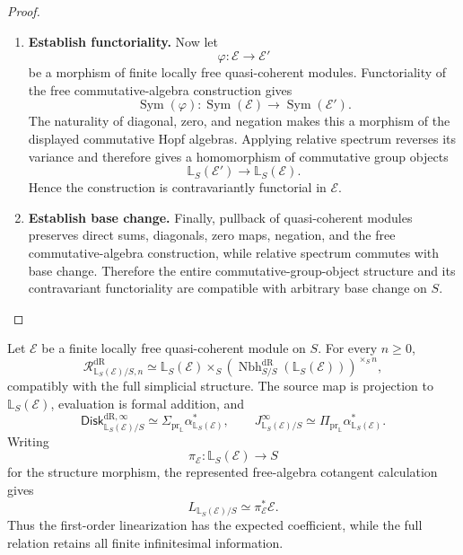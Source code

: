 \begin{proof}
\begin{enumerate}[label=\textup{(\arabic*)}]
    \item \textbf{Establish functoriality.}
Now let
\[
  \varphi:\mathcal E\to \mathcal E'
\]
be a morphism of finite locally free quasi-coherent modules. Functoriality of
the free commutative-algebra construction gives
\[
  \operatorname{Sym}(\varphi):
  \operatorname{Sym}(\mathcal E)\longrightarrow\operatorname{Sym}(\mathcal E').
\]
The naturality of diagonal, zero, and negation makes this a morphism of the
displayed commutative Hopf algebras. Applying relative spectrum reverses its
variance and therefore gives a homomorphism of commutative group objects
\[
  \mathbb L_S(\mathcal E')
  \longrightarrow
  \mathbb L_S(\mathcal E).
\]
Hence the construction is contravariantly functorial in \(\mathcal E\).

    \item \textbf{Establish base change.}
Finally, pullback of quasi-coherent modules preserves direct sums, diagonals,
zero maps, negation, and the free commutative-algebra construction, while
relative spectrum commutes with base change. Therefore the entire
commutative-group-object structure and its contravariant functoriality are
compatible with arbitrary base change on \(S\).
\end{enumerate}
\end{proof}
\begin{proposition}
\label{prop:linear-translation-presentation}
Let \(\mathcal E\) be a finite locally free quasi-coherent module on \(S\).
For every \(n\geq0\),
\[
  \mathcal R^{\mathrm{dR}}_{\mathbb L_S(\mathcal E)/S,n}
  \simeq
  \mathbb L_S(\mathcal E)\times_S(\operatorname{Nbh}^{\mathrm{dR}}_{S/S}(\mathbb L_S(\mathcal E)))^{\times_S n},
\]
compatibly with the full simplicial structure. The source map is projection to
\(\mathbb L_S(\mathcal E)\), evaluation is formal addition, and
\[
  \mathsf{Disk}^{\mathrm{dR},\infty}_{\mathbb L_S(\mathcal E)/S}
  \simeq
  \Sigma_{\operatorname{pr}_{\mathbb L}}\alpha_{\mathbb L_S(\mathcal E)}^*,
  \qquad
  J^\infty_{\mathbb L_S(\mathcal E)/S}
  \simeq
  \Pi_{\operatorname{pr}_{\mathbb L}}\alpha_{\mathbb L_S(\mathcal E)}^*.
\]
Writing
\[
  \pi_{\mathcal E}:\mathbb L_S(\mathcal E)\to S
\]
for the structure morphism, the represented free-algebra cotangent calculation gives
\[
  L_{\mathbb L_S(\mathcal E)/S}
  \simeq
  \pi_{\mathcal E}^*\mathcal E.
\]
Thus the first-order linearization has the expected coefficient, while the full
relation retains all finite infinitesimal information.
\end{proposition}

